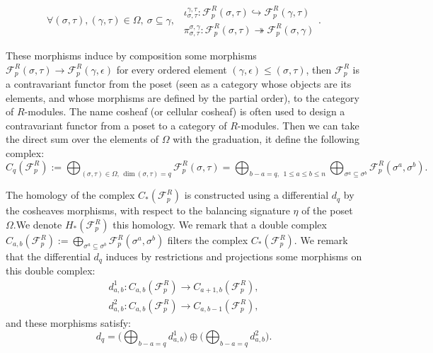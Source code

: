 \documentclass{article}
\begin{document}
\begin{equation*}
        \forall (\sigma, \tau),(\gamma,\tau) \in \Omega, ~\sigma \subseteq \gamma, ~~ \begin{array}{c} \iota_{\sigma,\tau}^{\gamma,\tau}: \mathcal{F}^R_p(\sigma,\tau) \hookrightarrow \mathcal{F}^R_p(\gamma,\tau) \\ \pi_{\sigma,\tau}^{\sigma,\gamma}: \mathcal{F}^R_p(\sigma,\tau) \twoheadrightarrow \mathcal{F}^R_p(\sigma,\gamma) 
        \end{array}.
\end{equation*}

These morphisms induce by composition some morphisms $\mathcal{F}^R_p(\sigma,\tau) \rightarrow \mathcal{F}^R_p(\gamma,\epsilon)$ for every ordered element $(\gamma,\epsilon)\leq(\sigma,\tau)$, then $\mathcal{F}^R_p$ is a contravariant functor from the poset (seen as a category whose objects are its elements, and whose morphisms are defined by the partial order), to the category of $R$-modules. The name cosheaf (or cellular cosheaf) is often used to design a contravariant functor from a poset to a category of $R$-modules. Then we can take the direct sum over the elements of $\Omega$ with the graduation, it define the following complex:
\begin{equation*}
    C_q(\mathcal{F}^R_p):=\bigoplus_{(\sigma,\tau) \in \Omega,~~\mathrm{dim}~(\sigma,\tau)=q} \mathcal{F}^R_p(\sigma,\tau) = \bigoplus_{b-a=q,~~1\leq a\leq b\leq n}\bigoplus_{\sigma^a\subseteq\sigma^b} \mathcal{F}^R_p(\sigma^a,\sigma^b).
\end{equation*}

The homology of the complex $C_*(\mathcal{F}^R_p)$ is constructed using a differential $d_q$ by the cosheaves morphisms, with respect to the balancing signature $\eta$ of the poset $\Omega$.We denote $H_*(\mathcal{F}_p^R)$ this homology. We remark that a double complex $C_{a,b}(\mathcal{F}^R_p):=\bigoplus_{\sigma^a\subseteq\sigma^b} \mathcal{F}^R_p(\sigma^a,\sigma^b)$ filters the complex $C_*(\mathcal{F}^R_p)$. We remark that the differential $d_q$ induces by restrictions and projections some morphisms on this double complex:
\begin{align*}
    d^1_{a,b}: C_{a,b}(\mathcal{F}^R_p) \rightarrow C_{a+1,b}(\mathcal{F}^R_p), \\
    d^2_{a,b}: C_{a,b}(\mathcal{F}^R_p) \rightarrow C_{a,b-1}(\mathcal{F}^R_p),
\end{align*}
and these morphisms satisfy:
\begin{equation*}
    d_q = \Bigg(\bigoplus_{b-a=q} d^1_{a,b} \Bigg) \oplus \Bigg( \bigoplus_{b-a=q} d^2_{a,b} \Bigg).
\end{equation*}
\end{document}
